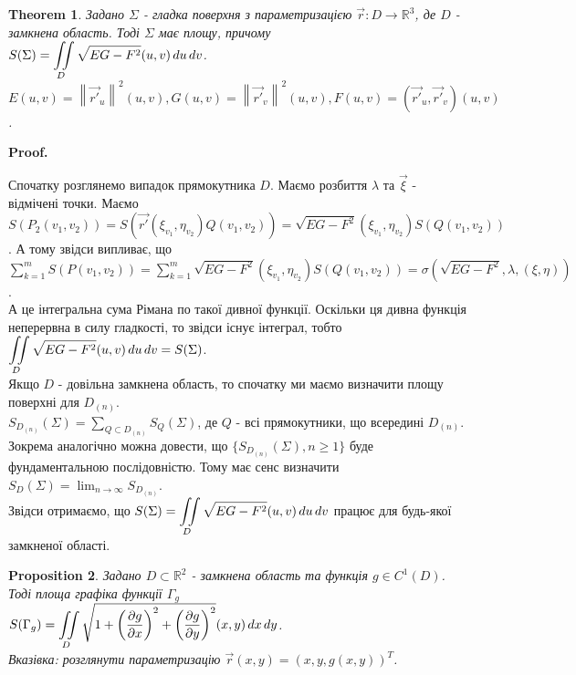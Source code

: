 \documentclass[a4paper, 10pt]{article}
\makeatletter
\def\departial#1#2{\dfrac{\partial {#1}}{\partial {#2}}}
\def\qed{$\blacksquare$}
\theoremstyle{theoremdd}
\newtheorem{theorem}{Theorem}[subsection]
\theoremstyle{theoremdd}
\theoremstyle{theoremdd}
\theoremstyle{theoremdd}
\theoremstyle{theoremdd}
\theoremstyle{theoremdd}
\theoremstyle{theoremdd}
\theoremstyle{theoremdd}
\theoremstyle{theoremdd}
\newtheorem{proposition}[theorem]{Proposition}
\theoremstyle{theoremdd}
\theoremstyle{theoremdd}
\theoremstyle{theoremdd}
\theoremstyle{theoremdd}
\theoremstyle{theoremdd}
\theoremstyle{theoremdd}
\renewenvironment{proof}[1][Proof.\\]{\par
\pushQED{\hfill \qed}%
\normalfont \topsep6\p@\@plus6\p@\relax
\trivlist
\item\relax
{\bfseries
#1\@addpunct{.}}\hspace\labelsep\ignorespaces
}{%
\popQED\endtrivlist\@endpefalse
}
\newcommand\Norm[1]{\left\lVert#1\right\rVert}
\makeatother
\begin{document}
\begin{theorem}
Задано $\Sigma$ - гладка поверхня з параметризацією $\vec{r}: D \to \mathbb{R}^3$, де $D$ - замкнена область. Тоді $\Sigma$ має площу, причому\\
$S(\Sigma) = \displaystyle\iint\displaylimits_D \sqrt{EG - F^2}(u,v)\,du\,dv$.\\
$E(u,v) = \Norm{\vec{r'}_u}^2(u,v), G(u,v) = \Norm{\vec{r'}_v}^2(u,v), F(u,v) = (\vec{r'}_u, \vec{r'}_v)(u,v)$.
\end{theorem}

\begin{proof}
Спочатку розглянемо випадок прямокутника $D$. Маємо розбиття $\lambda$ та $\vec{\xi}$ - відмічені точки. Маємо\\
$S(P_2(v_1,v_2)) = S(\vec{r'}(\xi_{v_1},\eta_{v_2})Q(v_1,v_2)) = \sqrt{EG-F^2}(\xi_{v_1},\eta_{v_2}) S(Q(v_1,v_2))$. А тому звідси випливає, що\\
$\displaystyle\sum_{k=1}^m S(P(v_1,v_2)) = \sum_{k=1}^m \sqrt{EG-F^2}(\xi_{v_1},\eta_{v_2}) S(Q(v_1,v_2)) = \sigma( \sqrt{EG-F^2}, \lambda, (\xi,\eta))$.\\
А це інтегральна сума Рімана по такої дивної функції. Оскільки ця дивна функція неперервна в силу гладкості, то звідси існує інтеграл, тобто\\
$\displaystyle\iint\displaylimits_{D} \sqrt{EG-F^2}(u,v)\,du\,dv = S(\Sigma)$.
\bigskip \\
Якщо $D$ - довільна замкнена область, то спочатку ми маємо визначити площу поверхні для $D_{(n)}$.\\
$S_{D_{(n)}}(\Sigma) = \displaystyle\sum_{Q \subset D_{(n)}} S_Q(\Sigma)$, де $Q$ - всі прямокутники, що всередині $D_{(n)}$. Зокрема аналогічно можна довести, що $\{ S_{D_{(n)}}(\Sigma), n \geq 1 \}$ буде фундаментальною послідовністю. Тому має сенс визначити\\
$S_D(\Sigma) = \displaystyle\lim_{n \to \infty} S_{D_{(n)}}$.\\
Звідси отримаємо, що $S(\Sigma) = \displaystyle\iint\displaylimits_D \sqrt{EG - F^2}(u,v)\,du\,dv$ працює для будь-якої замкненої області.
\end{proof}

\begin{proposition}
Задано $D \subset \mathbb{R}^2$ - замкнена область та функція $g \in C^1(D)$. Тоді площа графіка функції $\Gamma_g$\\
$S(\Gamma_g) = \displaystyle\iint\displaylimits_D \sqrt{1+ \left(\departial{g}{x} \right)^2 + \left(\departial{g}{y} \right)^2 } (x,y)\,dx\,dy$.\\
\textit{Вказівка: розглянути параметризацію $\vec{r}(x,y) = (x,y,g(x,y))^T$.}
\end{proposition}
\end{document}
